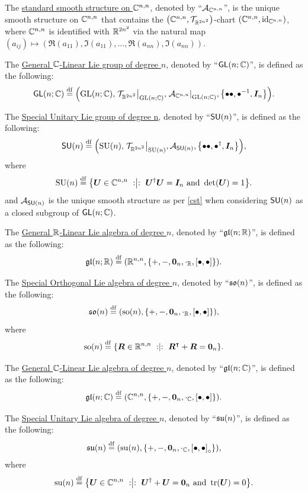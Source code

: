 \documentclass[11pt,reqno]{amsart}
\begin{document}
\begin{Def}
The \ul{standard smooth structure on $\mathbb{C}^{n,n}$},
denoted by ``$\mathcal{A}_{\mathbb{C}^{n,n}}$'',
is the unique smooth structure on $\mathbb{C}^{n,n}$ that contains
the $\Br{\C^{n,n},\T_{\R^{2n^2}}}$-chart $\Br{\C^{n,n},\id_{\C^{n,n}}}$,
where $\mathbb{C}^{n,n}$ is identified with $\mathbb{R}^{2n^2}$ via the natural map
$(a_{ij}) \mapsto (\Re(a_{11}),\Im(a_{11}),\dots,\Re(a_{nn}),\Im(a_{nn}))$.
\end{Def}

\begin{Def}
The \ul{General $\mathbb{C}$-Linear Lie group of degree $n$},
denoted by ``$\operatorname{\mathsf{GL}}(n;\mathbb{C})$'', is defined as the following:
\[
\GL(n;\C)\df\Br{\GLset(n;\C),\eval{\T_{\R^{2n^2}}}_{\GLset(n;\C)},
\eval{\A_{\C^{n,n}}}_{\GLset(n;\C)},\set{
\bullet\bullet,\bullet\inv,\bm I_n}}.
\]
\end{Def}

\begin{Def}
The \ul{Special Unitary Lie group of degree n}, denoted by ``$\operatorname{\mathsf{SU}}(n)$'',
is defined as the following:
\[
\SU(n)\df\Br{\SUset(n),\eval{\T_{\R^{2n^2}}}_{\SUset(n)},\A_{\SU(n)},
\set{\bullet\bullet,\bullet\herm,\bm I_n}},
\]
where
\[
\SUset(n)\df\set{\bm U\in\C^{n,n}\st\bm U\herm\bm U=\bm I_n
\tand\det\Br{\bm U}=1}.
\]
and $\mathcal{A}_{\operatorname{\mathsf{SU}}(n)}$ is the unique smooth structure as per \ref{cst}
when considering $\operatorname{\mathsf{SU}}(n)$ as a closed subgroup of $\operatorname{\mathsf{GL}}(n;\mathbb{C})$.
\end{Def}

\begin{Def}
The \ul{General $\mathbb{R}$-Linear Lie algebra of degree $n$},
denoted by ``$\mathfrak{gl}(n;\mathbb{R})$'', is defined as the following:
\[
\gl(n;\R)\df\Br{\R^{n,n},\set{+,-,\bm0_n,\cdot_\R,\SqBr{\bullet,\bullet}}}.
\]
\end{Def}

\begin{Def}
The \ul{Special Orthogonal Lie algebra of degree $n$},
denoted by ``$\mathfrak{so}(n)$'', is defined as the following:
\[
\so(n)\df\Br{\soset(n),\set{+,-,\bm0_n,\cdot_\R,\SqBr{\bullet,\bullet}}},
\]
where
\[
\soset(n)\df\set{\bm R\in\R^{n,n}\st\bm R\transp+\bm R=\bm0_n}.
\]
\end{Def}

\begin{Def}
The \ul{General $\mathbb{C}$-Linear Lie algebra of degree $n$},
denoted by ``$\mathfrak{gl}(n;\mathbb{C})$'', is defined as the following:
\[
\gl(n;\C)\df\Br{\C^{n,n},\set{+,-,\bm0_n,\cdot_\C,\SqBr{\bullet,\bullet}}}.
\]
\end{Def}

\begin{Def}
The \ul{Special Unitary Lie algebra of degree $n$},
denoted by ``$\mathfrak{su}(n)$'', is defined as the following:
\[
\su(n)\df\Br{\suset(n),\set{+,-,\bm0_n,\cdot_\C,\SqBr{\bullet,\bullet}_\circ}},
\]
where
\[
\suset(n)\df\set{\bm U\in\C^{n,n}\st\bm U\herm+\bm U=\bm0_n\tand\tr(\bm U)=0}.
\]
\end{Def}
\end{document}
